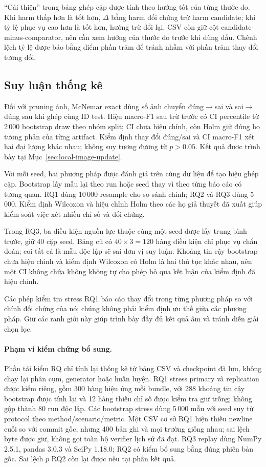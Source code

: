 ``Cải thiện'' trong bảng ghép cặp được tính theo hướng tốt của từng thước đo. Khi harm thấp hơn là tốt hơn, $\Delta$ bằng harm đối chứng trừ harm candidate; khi tỷ lệ phục vụ cao hơn là tốt hơn, hướng trừ đổi lại. CSV còn giữ cột candidate-minus-comparator, nên cần xem hướng của thước đo trước khi dùng dấu. Chênh lệch tỷ lệ được báo bằng điểm phần trăm để tránh nhầm với phần trăm thay đổi tương đối.

\subsection{Suy luận thống kê}
Đối với pruning ảnh, McNemar exact dùng số ảnh chuyển đúng$\to$sai và sai$\to$đúng sau khi ghép cùng ID test. Hiệu macro-F1 sau trừ trước có CI percentile từ 2\,000 bootstrap draw theo nhóm split; CI chưa hiệu chỉnh, còn Holm giữ đúng họ tương phản của từng artifact. Kiểm định thay đổi đúng/sai và CI macro-F1 xét hai đại lượng khác nhau; không suy tương đương từ $p>0.05$. Kết quả được trình bày tại Mục~\ref{sec:local-image-update}.

Với mỗi seed, hai phương pháp được đánh giá trên cùng dữ liệu để tạo hiệu ghép cặp. Bootstrap lấy mẫu lại theo run hoặc seed thay vì theo từng báo cáo có tương quan. RQ1 dùng 10\,000 resample cho so sánh chính; RQ2 và RQ3 dùng 5\,000. Kiểm định Wilcoxon và hiệu chỉnh Holm theo các họ giả thuyết đã xuất giúp kiểm soát việc xét nhiều chỉ số và đối chứng.

Trong RQ3, ba điều kiện nguồn lực thuộc cùng một seed được lấy trung bình trước, giữ 40 cặp seed. Bảng cũ có $40\times3=120$ hàng điều kiện chỉ phục vụ chẩn đoán; coi tất cả là mẫu độc lập sẽ sai đơn vị suy luận. Khoảng tin cậy bootstrap chưa hiệu chỉnh và kiểm định Wilcoxon có Holm là hai thủ tục khác nhau, nên một CI không chứa không không tự cho phép bỏ qua kết luận của kiểm định đã hiệu chỉnh.

Các phép kiểm tra stress RQ1 báo cáo thay đổi trong từng phương pháp so với chính đối chứng của nó; chúng không phải kiểm định ưu thế giữa các phương pháp. Giữ các ranh giới này giúp trình bày đầy đủ kết quả âm và tránh diễn giải chọn lọc.

\paragraph{Phạm vi kiểm chứng bổ sung.} Phần tái kiểm RQ chỉ tính lại thống kê từ bảng CSV và checkpoint đã lưu, không chạy lại phân cụm, generator hoặc huấn luyện. RQ1 stress primary và replication được kiểm riêng, gồm 300 hàng hiệu ứng mỗi bundle, với 288 khoảng tin cậy bootstrap được tính lại và 12 hàng thiếu chỉ số được kiểm tra giữ trống; không gộp thành 80 run độc lập. Các bootstrap stress dùng 5\,000 mẫu với seed suy từ protocol theo method/scenario/metric. Một CSV cơ sở RQ1 hiện thiếu newline cuối so với commit gốc, nhưng 400 bản ghi và mọi trường giống nhau; sai lệch byte được giữ, không gọi toàn bộ verifier lịch sử đã đạt. RQ3 replay dùng NumPy 2.5.1, pandas 3.0.3 và SciPy 1.18.0; RQ2 có kiểm bổ sung bằng đúng phiên bản gốc. Sai lệch $p$ RQ2 còn lại được nêu tại phần kết quả.

